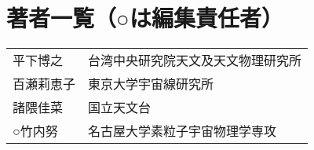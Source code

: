 \newpage
\section*{著者一覧（○は編集責任者）}

\begin{tabular}{ll}
平下博之 & 台湾中央研究院天文及天文物理研究所 \\
百瀬莉恵子 & 東京大学宇宙線研究所 \\
諸隈佳菜 & 国立天文台 \\
○竹内努　& 名古屋大学素粒子宇宙物理学専攻
\end{tabular}

